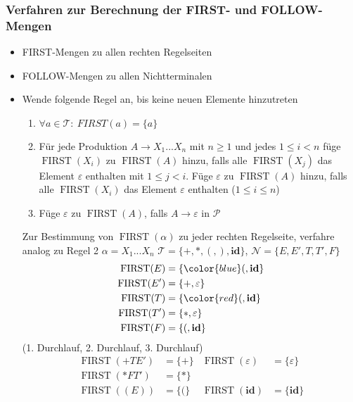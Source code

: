\subsubsection{Verfahren zur Berechnung der FIRST- und FOLLOW-Mengen}
\begin{itemize}
 \item FIRST-Mengen zu allen rechten Regelseiten
 \item FOLLOW-Mengen zu allen Nichtterminalen
 \item Wende folgende Regel an, bis keine neuen  Elemente hinzutreten
     \begin{enumerate}
      \item $\forall a \in \mathcal{T}{:}\ FIRST(a) = \{a\}$
      \item Für jede Produktion $A \to X_1...X_n$ mit $n \geq 1$ und jedes $1 \leq i < n$ füge $\operatorname{FIRST}(X_i)$ zu $\operatorname{FIRST}(A)$ hinzu, falls alle $\operatorname{FIRST}(X_j)$ das Element $\varepsilon$ enthalten mit $1 \leq j < i$.
      Füge $\varepsilon$ zu $\operatorname{FIRST}(A)$ hinzu, falls alle $\operatorname{FIRST}(X_i)$ das Element $\varepsilon$ enthalten ($1 \leq i \leq n$)
      \item Füge $\varepsilon$ zu $\operatorname{FIRST}(A)$, falls $A \to \varepsilon$ in $\mathcal{P}$
     \end{enumerate}
     Zur Bestimmung von $\operatorname{FIRST}(\alpha)$ zu jeder rechten Regelseite, verfahre analog zu Regel 2 $\alpha = X_1...X_n$
  \Bsp  $\mathcal{T} = \{+,*,(,),\textbf{id}\}$,
        $\mathcal{N} = \{E, E', T, T', F\}$
        \begin{align*}
         \operatorname{FIRST}(E) &= \{{\color{blue}(, \textbf{id}}\} \\
         \operatorname{FIRST}(E') &= \{+, \varepsilon\} \\
         \operatorname{FIRST}(T) &= \{{\color{red}(, \textbf{id}}\} \\
         \operatorname{FIRST}(T') &= \{*, \varepsilon\} \\
         \operatorname{FIRST}(F) &= \{(, \textbf{id}\}
        \end{align*}
        (1. Durchlauf, {\color{red}2. Durchlauf}, {\color{blue}3. Durchlauf})
        \begin{align*}
         \operatorname{FIRST}(+TE') &= \{+\}  & \operatorname{FIRST}(\varepsilon) &= \{\varepsilon\} \\
         \operatorname{FIRST}(*FT') &= \{*\} \\
         \operatorname{FIRST}((E)) &= \{(\}   & \operatorname{FIRST}(\textbf{id}) &= \{\textbf{id}\}

\end{align*}
\end{itemize}

